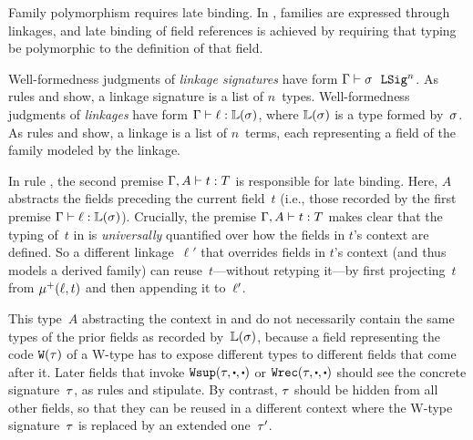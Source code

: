 
Family polymorphism requires late binding.
In \TT, families are expressed through linkages, and late binding of
field references is achieved by requiring that typing be polymorphic to
the definition of that field.

Well-formedness judgments of \emph{linkage signatures} have form
$ {\Gamma} \vdash {\ensuremath{\sigma}} \ \ \texttt{LSig}^{n} $.
As rules  and  show, a linkage
signature is a list of $n$~types.
%
Well-formedness judgments of \emph{linkages} have form $ {\Gamma} \vdash {\ensuremath{\ell}} : {\mathbb{L}({\sigma})} $,
where $\mathbb{L}({\sigma})$ is a type formed by~$\sigma$.
As rules  and  show, a linkage is a list
of $n$~terms, each representing a field of the family modeled by the linkage.

In rule , the second premise $ {\Gamma, A} \vdash {t} : {T} $ is
responsible for late binding.
Here, $A$ abstracts the fields preceding the current field~$t$
(i.e., those recorded by the first premise $ {\Gamma} \vdash {\ensuremath{\ell}} : {\mathbb{L}({\sigma})} $).
Crucially, %
the premise $ {\Gamma, A} \vdash {t} : {T} $ makes clear that
the typing of~$t$ in  is \emph{universally} quantified over
how the fields in $t$'s context are defined.
So a different linkage~$\ell'$ that overrides fields in $t$'s context (and thus models a derived family)
can reuse~$t$---without retyping it---by first
projecting~$t$ from $\mu^+({\ell},{t})$ and then appending it to~$\ell'$.

This type~$A$ abstracting the context in  and
 do not necessarily contain the same types of the prior fields as recorded by~$\mathbb{L}({\sigma})$,
because a field representing the code $\texttt{W}({\tau})$ of a W-type has to
expose different types to different fields that come after it.
Later fields that invoke
$\Wsup{\wsig}{\cDot}{\cDot}$ or $\Wrec{\wsig}{\cDot}{\cDot}$
should see the concrete signature~$\tau$, as rules 
and  stipulate.
By contrast, $\tau$ should be hidden
from all other fields, so that they can be reused
in a different context where the W-type signature~$\tau$ is replaced by an extended one~$\tau'$.


